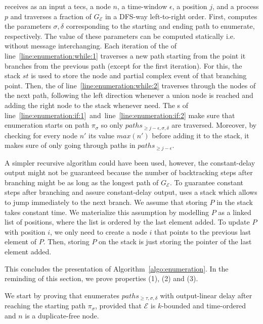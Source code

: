  receives as an input a \acrshort{tecs}, a node $n$, a time-window $\epsilon$, a position $j$, and a process $p$ and traverses a fraction of $G_{\mathcal{E}}$ in a DFS-way left-to-right order. First, computes the parameters $\sigma, \delta$ corresponding to the starting and ending path to enumerate, respectively. The value of these parameters can be computed statically i.e. without message interchanging.  Each iteration of the  of line~\ref{line:enumeration:while:1} traverses a new path starting from the point it branches from the previous path (except for the first iteration). For this, the stack $st$ is used to store the node and partial complex event of that branching point. Then, the  of line~\ref{line:enumeration:while:2} traverses through the nodes of the next path, following the left direction whenever a union node is reached and adding the right node to the stack whenever need. The s of line~\ref{line:enumeration:if:1}~and~line~\ref{line:enumeration:if:2} make sure that enumeration starts on path $\pi_{\sigma}$ so only $paths_{\ge j - \epsilon, \sigma, \delta}$ are traversed. Moreover, by checking for every node $n'$ its value $max(n')$ before adding it to the stack, it makes sure of only going through paths in $paths_{\ge j - \epsilon}$.

A simpler recursive algorithm could have been used, however, the constant-delay output might not be guaranteed because the number of backtracking steps after branching might be as long as the longest path of $G_{\mathcal{E}}$. To guarantee constant steps after branching and assure constant-delay output,  uses a stack which allows to jump immediately to the next branch. We assume that storing $P$ in the stack takes constant time. We materialize this assumption by modelling $P$ as a linked list of positions, where the list is ordered by the last element added. To update $P$ with position $i$, we only need to create a node $i$ that points to the previous last element of $P$. Then, storing $P$ on the stack is just storing the pointer of the last element added.

This concludes the presentation of Algorithm~\ref{algo:enumeration}. In the reminding of this section, we prove properties (1), (2) and (3).

We start by proving that  enumerates $paths_{\ge \tau, \sigma, \delta}$ with output-linear delay after reaching the starting path $\pi_{\sigma}$, provided that $\mathcal{E}$ is $k$-bounded and time-ordered and $n$ is a duplicate-free node.

